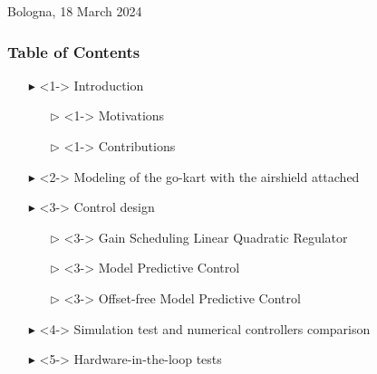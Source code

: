 \documentclass[10pt, aspectratio=169]{beamer}
\begin{document}
\begin{frame}

\vspace{0.5cm}
\begin{center}
\scriptsize
  \textcolor{emph@Thesis}{Bologna, 18 March 2024}
\end{center}
\end{frame}


\begin{frame}
\frametitle{Table of Contents}
\begin{itemize}
	\footnotesize
	\item[$\blacktriangleright$]<1-> Introduction
		\begin{itemize}
			\footnotesize
			\item[$\triangleright$]<1-> Motivations
			\item[$\triangleright$]<1-> Contributions
		\end{itemize}
	\item[$\blacktriangleright$]<2-> Modeling of the go-kart with the airshield attached
	\item[$\blacktriangleright$]<3-> Control design
		\begin{itemize}
			\footnotesize
			\item[$\triangleright$]<3-> Gain Scheduling Linear Quadratic Regulator
			\item[$\triangleright$]<3-> Model Predictive Control
			\item[$\triangleright$]<3-> Offset-free Model Predictive Control
		\end{itemize}
	\item[$\blacktriangleright$]<4-> Simulation test and numerical controllers comparison
	\item[$\blacktriangleright$]<5-> Hardware-in-the-loop tests
\end{itemize}
\end{frame}
\end{document}
